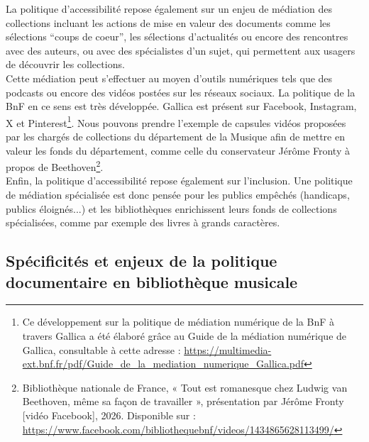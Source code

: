 La politique d'accessibilité repose également sur un enjeu de médiation des collections incluant les actions de mise en valeur des documents comme les sélections \enquote{coups de coeur}, les sélections d'actualités ou encore des rencontres avec des auteurs, ou avec des spécialistes d'un sujet, qui permettent aux usagers de découvrir les collections. \\
Cette médiation peut s'effectuer au moyen d'outils numériques tels que des podcasts ou encore des vidéos postées sur les réseaux sociaux. La politique de la BnF en ce sens est très développée. Gallica est présent sur Facebook, Instagram, X et Pinterest\footnote{Ce développement sur la politique de médiation numérique de la BnF à travers Gallica a été élaboré grâce au Guide de la médiation numérique de Gallica, consultable à cette adresse : \url{https://multimedia-ext.bnf.fr/pdf/Guide_de_la_mediation_numerique_Gallica.pdf}}. 
Nous pouvons prendre l'exemple de capsules vidéos proposées par les chargés de collections du département de la Musique afin de mettre en valeur les fonds du département, comme celle du conservateur Jérôme Fronty à propos de Beethoven\footnote{Bibliothèque nationale de France, « Tout est romanesque chez Ludwig van Beethoven, même sa façon de travailler », présentation par Jérôme Fronty [vidéo Facebook], 2026. Disponible sur : \url{https://www.facebook.com/bibliothequebnf/videos/1434865628113499/}}.\\
Enfin, la politique d'accessibilité repose également sur l'inclusion. Une politique de médiation spécialisée est donc pensée pour les publics empêchés (handicaps, publics éloignés...) et les bibliothèques enrichissent leurs fonds de collections spécialisées, comme par exemple des livres à grands caractères. 

\subsection*{Spécificités et enjeux de la politique documentaire en bibliothèque musicale}

